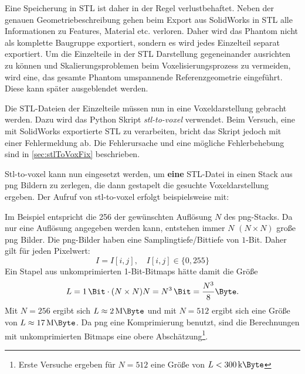 Eine Speicherung in STL ist daher in der Regel verlustbehaftet. Neben der genauen Geometriebeschreibung gehen beim Export aus SolidWorks in STL alle Informationen zu Features, Material etc. verloren. Daher wird das Phantom nicht als komplette Baugruppe exportiert, sondern es wird jedes Einzelteil separat exportiert. Um die Einzelteile in der STL Darstellung gegeneinander ausrichten zu können und Skalierungsproblemen beim Voxelisierungsprozess zu vermeiden, wird eine, das gesamte Phantom umspannende Referenzgeometrie eingeführt. Diese kann später ausgeblendet werden.

Die STL-Dateien der Einzelteile müssen nun in eine Voxeldarstellung gebracht werden. Dazu wird das Python Skript \textit{stl-to-voxel} \cite{stlToVox} verwendet. Beim Versuch, eine mit SolidWorks exportierte STL zu verarbeiten, bricht das Skript jedoch mit einer Fehlermeldung ab. Die Fehlerursache und eine mögliche Fehlerbehebung sind in \autoref{sec:stlToVoxFix} beschrieben.

Stl-to-voxel kann nun eingesetzt werden, um \textbf{eine} STL-Datei in einen Stack aus png Bildern zu zerlegen, die dann gestapelt die gesuchte Voxeldarstellung ergeben.
Der Aufruf von stl-to-voxel erfolgt beispielsweise mit:

Im Beispiel entspricht die 256 der gewünschten Auflösung $N$ des png-Stacks. Da nur eine Auflösung angegeben werden kann, entstehen immer $N$ $(N\times N)$ große png Bilder. Die png-Bilder haben eine Samplingtiefe/Bittiefe von $1$-Bit. Daher gilt für jeden Pixelwert:
\begin{equation}
	I = I[i,j] , \quad I[i,j] \in \{0, 255\}
\end{equation}
Ein Stapel aus unkomprimierten 1-Bit-Bitmaps hätte damit die Größe
\begin{equation}
	L=\SI{1}{\Bit} \cdot (N \times N) N = N^3 \,\SI{}{\Bit} = \frac{N^3}{8} \SI{}{\Byte}.
\end{equation}
Mit $N=256$ ergibt sich $L\approx \SI{2}{\mega\Byte}$ und mit $N=512$ ergibt sich eine Größe von $L\approx \SI{17}{\mega\Byte}$. Da png eine Komprimierung benutzt, sind die Berechnungen mit unkomprimierten Bitmaps eine obere Abschätzung\footnote{Erste Versuche ergeben für $N=512$ eine Größe von $L<\SI{300}{\kilo\Byte}$}.

